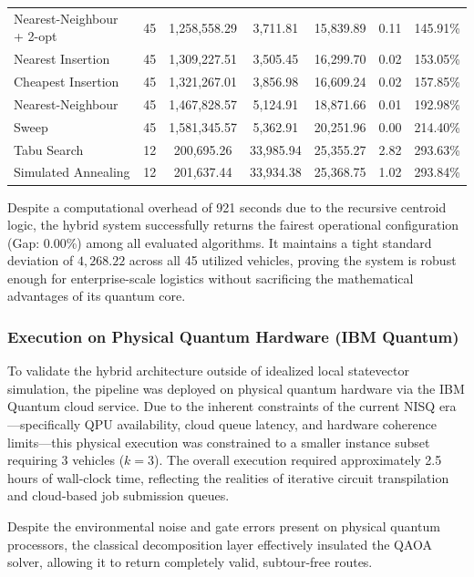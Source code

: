 \documentclass[a4paper]{report}
\begin{document}
{\begin{itemize}
\begin{itemize}
\begin{table}[H]
{\begin{tabular}{lcccccc}
Nearest-Neighbour + 2-opt & 45 & 1,258,558.29 & 3,711.81 & 15,839.89 & 0.11 & 145.91\% \\
Nearest Insertion & 45 & 1,309,227.51 & 3,505.45 & 16,299.70 & 0.02 & 153.05\% \\
Cheapest Insertion & 45 & 1,321,267.01 & 3,856.98 & 16,609.24 & 0.02 & 157.85\% \\
Nearest-Neighbour & 45 & 1,467,828.57 & 5,124.91 & 18,871.66 & 0.01 & 192.98\% \\
Sweep & 45 & 1,581,345.57 & 5,362.91 & 20,251.96 & 0.00 & 214.40\% \\
\midrule
Tabu Search & 12 & 200,695.26 & 33,985.94 & 25,355.27 & 2.82 & 293.63\% \\
Simulated Annealing & 12 & 201,637.44 & 33,934.38 & 25,368.75 & 1.02 & 293.84\% \\ 
\bottomrule
\end{tabular}
}
\end{table}

Despite a computational overhead of 921 seconds due to the recursive centroid logic, the hybrid system successfully returns the fairest operational configuration (Gap: 0.00\%) among all evaluated algorithms. It maintains a tight standard deviation of $4,268.22$ across all 45 utilized vehicles, proving the system is robust enough for enterprise-scale logistics without sacrificing the mathematical advantages of its quantum core.

\subsubsection{Execution on Physical Quantum Hardware (IBM Quantum)}

To validate the hybrid architecture outside of idealized local statevector simulation, the pipeline was deployed on physical quantum hardware via the IBM Quantum cloud service. Due to the inherent constraints of the current NISQ era—specifically QPU availability, cloud queue latency, and hardware coherence limits—this physical execution was constrained to a smaller instance subset requiring 3 vehicles ($k=3$). The overall execution required approximately 2.5 hours of wall-clock time, reflecting the realities of iterative circuit transpilation and cloud-based job submission queues.

Despite the environmental noise and gate errors present on physical quantum processors, the classical decomposition layer effectively insulated the QAOA solver, allowing it to return completely valid, subtour-free routes. 


\end{itemize}
\end{itemize}}
\end{document}

